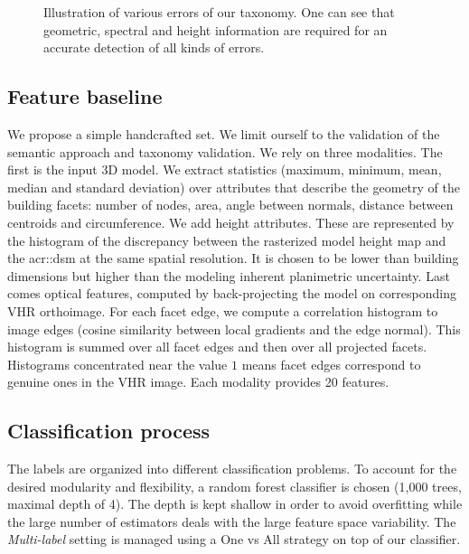 \documentclass[conference]{IEEEtran}
\newcounter{SubFigCounter}
\begin{document}
\begin{figure}
\begin{center}
{{                    \renewcommand{\thesubfigure}{\roman{SubFigCounter}}
					\vspace{-.3cm}
                    \label{fig::fac_err}
                    \addtocounter{figure}{-1}
                }
            }
            {
            	\vspace{-.4cm}
                \caption{\label{fig::samples}Illustration of various errors of our taxonomy. One can see that geometric, spectral and height information are required for an accurate detection of all kinds of errors.}
            }
        \end{center}
    \end{figure}

\subsection{Feature baseline}

	We propose a simple handcrafted set. We limit ourself to the validation of the semantic approach and taxonomy validation. We rely on three modalities. The first is the input 3D model. We extract statistics (maximum, minimum, mean, median and standard deviation) over attributes that describe the geometry of the building facets: number of nodes, area, angle between normals, distance between centroids and circumference. We add height attributes. These are represented by the histogram of the discrepancy between the rasterized model height map and the \acrshort{acr::dsm} at the same spatial resolution. It is chosen to be lower than building dimensions but higher than the modeling inherent planimetric uncertainty. Last comes optical features, computed by back-projecting the model on corresponding VHR orthoimage. For each facet edge, we compute a correlation histogram to image edges (cosine similarity between local gradients and the edge normal). This histogram is summed over all facet edges and then over all projected facets. Histograms concentrated near the value $1$ means facet edges correspond to genuine ones in the VHR image. Each modality provides 20 features.

\subsection{Classification process}

The labels are organized into different classification problems. To account for the desired modularity and flexibility, a random forest classifier is chosen (1,000 trees, maximal depth of 4). The depth is kept shallow in order to avoid overfitting while the large number of estimators deals with the large feature space variability. The \textit{Multi-label} setting is managed using a One vs All strategy on top of our classifier.
\end{document}
